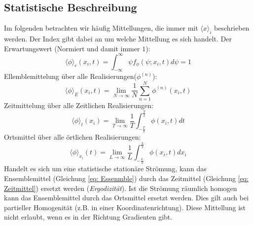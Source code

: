 \subsection{Statistische Beschreibung}
Im folgenden betrachten wir häufig Mittellungen, die immer mit $\langle x \rangle_{i}$ beschrieben werden. Der Index gibt dabei an um welche Mittellung es sich handelt. 
Der Erwartungswert (Normiert und damit immer $1$):
\begin{equation}
	\langle\phi\rangle_{e}\left(x_{i}, t\right)=\int_{-\infty}^{\infty} \psi f_{\phi}\left(\psi ; x_{i}, t\right) d \psi = 1
\end{equation}
Ellemblemittelung über alle Realisierungen($\phi^{(n)}$):
\begin{equation}
	\label{eq: Essenmble}
	\langle\phi\rangle_{E}\left(x_{i}, t\right)=\lim _{N \rightarrow \infty} \frac{1}{N} \sum_{n=1}^{N} \phi^{(n)}\left(x_{i}, t\right)
\end{equation}
Zeitmittelung über alle Zeitlichen Realisierungen:
\begin{equation}
	\label{eq: Zeitmittel}
	\langle\phi\rangle_{t}\left(x_{i}\right)=\lim _{T \rightarrow \infty} \frac{1}{T} \int^{\frac{T}{2}}_{-\frac{T}{2}} \phi\left(x_{i}, t\right) d t
\end{equation}
Ortsmittel über alle örtlichen Realisierungen:
\begin{equation}
	\langle\phi\rangle_{x_{i}}(t)=\lim _{L \rightarrow \infty} \frac{1}{L} \int_{-\frac{L}{2}}^{\frac{L}{2}} \phi\left(x_{i}, t\right) d x_{i}
\end{equation}
Handelt es sich um eine statistische stationäre Strömung, kann das Ensemblemittel (Gleichung \ref{eq: Essenmble}) durch das Zeitmittel (Gleichung \ref{eq: Zeitmittel}) ersetzt werden (\textit{Ergodizität}).
Ist die Strömung räumlich homogen kann das Ensemblemittel durch das Ortsmittel ersetzt werden. Dies gilt auch bei partieller Homogenität (z.B. in einer Koordinatenrichtung). Diese Mittellung ist nicht erlaubt, wenn es in der Richtung Gradienten gibt. 


